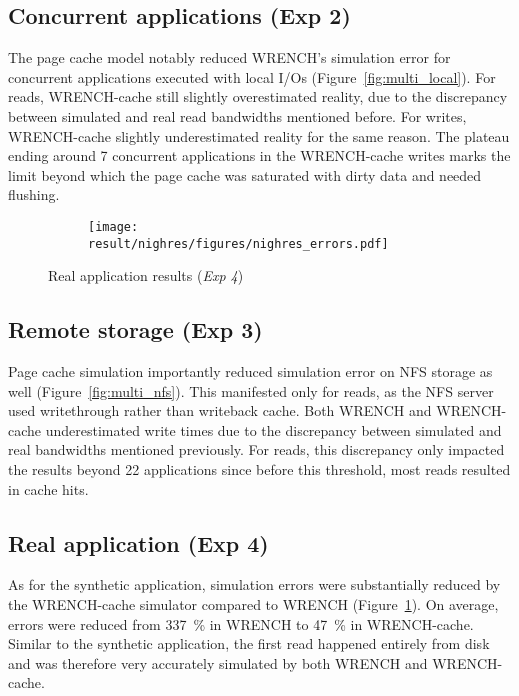 \documentclass[conference]{IEEEtran}
\newcommand{\tristan}[1]{}%
\newcommand{\wrench}{WRENCH\xspace}
\begin{document}
        \subsection{Concurrent applications (Exp 2)}

            The page cache model notably reduced \wrench's simulation error
            for concurrent applications executed with local I/Os
            (Figure~\ref{fig:multi_local}). For reads, \wrench-cache still
            slightly overestimated reality, due to the discrepancy between
            simulated and real read bandwidths mentioned before. For writes,
            \wrench-cache slightly underestimated reality for the same reason. The plateau
            ending around 7 concurrent applications in the \wrench-cache writes
            marks the limit beyond which the page cache was saturated with dirty data
            and needed flushing. \tristan{why is there no plateau in real life?}

            \begin{figure}[b]
                \begin{subfigure}{0.95\linewidth}
                    \centering
                    \texttt{[image: result/nighres/figures/nighres\_errors.pdf]}
                \end{subfigure}
                \caption{Real application results (\textit{Exp 4}) \tristan{increase font size}}
                \label{fig:nighres}
                \end{figure}
        \subsection{Remote storage (Exp 3)}

            Page cache simulation importantly reduced simulation error
            on NFS storage as well (Figure~\ref{fig:multi_nfs}). This
            manifested only for reads, as the NFS server used writethrough rather than writeback cache.
            Both \wrench and \wrench-cache
            underestimated write times due to the discrepancy between
            simulated and real bandwidths mentioned previously. For reads,
            this discrepancy only impacted the results beyond 22
            applications since before this threshold, most reads resulted in cache
            hits.


        \subsection{Real application (Exp 4)}
        As for the synthetic application, simulation errors were
        substantially reduced by the WRENCH-cache simulator compared to
        WRENCH (Figure~\ref{fig:nighres}). On average, errors were reduced
        from 337~\% in WRENCH to 47~\% in WRENCH-cache. 
        Similar to
        the synthetic application, the first read happened entirely from disk and was therefore 
        very accurately simulated by both WRENCH and WRENCH-cache.
 
\end{document}
